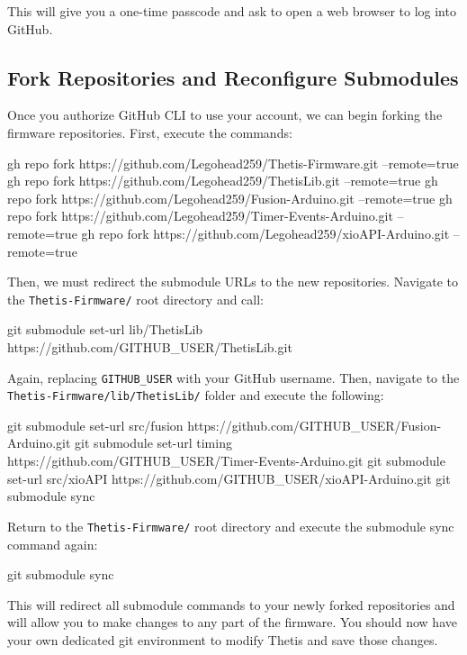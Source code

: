 This will give you a one-time passcode and ask to open a web browser to log into GitHub.

\subsection{Fork Repositories and Reconfigure Submodules}
Once you authorize GitHub CLI to use your account, we can begin forking the firmware repositories.
First, execute the commands:

\begin{bash}
    gh repo fork https://github.com/Legohead259/Thetis-Firmware.git --remote=true
    gh repo fork https://github.com/Legohead259/ThetisLib.git --remote=true
    gh repo fork https://github.com/Legohead259/Fusion-Arduino.git --remote=true
    gh repo fork https://github.com/Legohead259/Timer-Events-Arduino.git --remote=true
    gh repo fork https://github.com/Legohead259/xioAPI-Arduino.git --remote=true
\end{bash}

Then, we must redirect the submodule URLs to the new repositories.
Navigate to the \lstinline[style=customInline]|Thetis-Firmware/| root directory and call:

\begin{bash}
    git submodule set-url lib/ThetisLib https://github.com/GITHUB_USER/ThetisLib.git
\end{bash}

Again, replacing \lstinline[style=customInline]|GITHUB_USER| with your GitHub username.
Then, navigate to the \lstinline[style=customInline]|Thetis-Firmware/lib/ThetisLib/| folder and execute the following:

\begin{bash}
    git submodule set-url src/fusion https://github.com/GITHUB_USER/Fusion-Arduino.git
    git submodule set-url timing https://github.com/GITHUB_USER/Timer-Events-Arduino.git
    git submodule set-url src/xioAPI https://github.com/GITHUB_USER/xioAPI-Arduino.git
    git submodule sync
\end{bash}

Return to the \lstinline[style=customInline]|Thetis-Firmware/| root directory and execute the submodule sync command again:

\begin{bash}
    git submodule sync
\end{bash}

This will redirect all submodule commands to your newly forked repositories and will allow you to make changes to any part of the firmware.
You should now have your own dedicated git environment to modify Thetis and save those changes.
